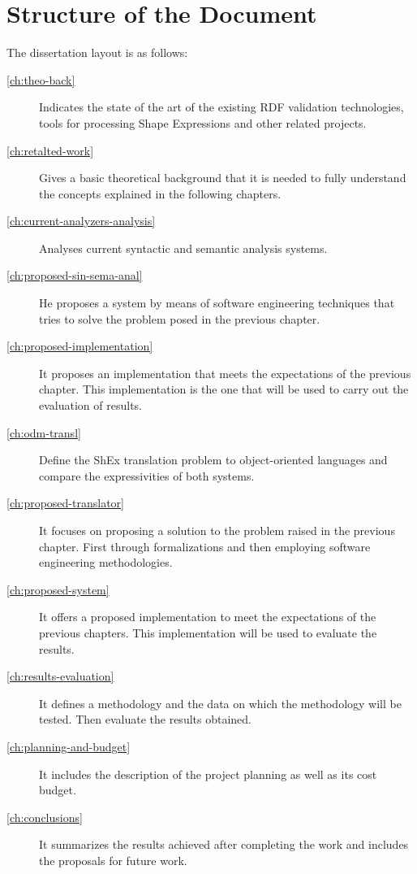 
\section{Structure of the Document}
\label{sec:intro-structure}
The dissertation layout is as follows:
\bigskip

\begin{description}
  \item[\cref{ch:theo-back}] Indicates the state of the art of the existing RDF validation technologies, tools for processing Shape
  Expressions and other related projects.
	\item[\cref{ch:retalted-work}] Gives a basic theoretical background that it is needed to fully understand the concepts explained in the
  following chapters.
  \item[\cref{ch:current-analyzers-analysis}] Analyses current syntactic and semantic analysis systems.
  \item[\cref{ch:proposed-sin-sema-anal}] He proposes a system by means of software engineering techniques
  that tries to solve the problem posed in the previous chapter.
  \item[\cref{ch:proposed-implementation}] It proposes an implementation that meets the expectations of the previous chapter.
  This implementation is the one that will be used to carry out the evaluation of results.
  \item[\cref{ch:odm-transl}] Define the ShEx translation problem to object-oriented languages and compare the
  expressivities of both systems.
  \item[\cref{ch:proposed-translator}] It focuses on proposing a solution to the problem raised in the previous chapter.
  First through formalizations and then employing software engineering methodologies.
  \item[\cref{ch:proposed-system}] It offers a proposed implementation to meet the expectations of the previous chapters.
  This implementation will be used to evaluate the results.
  \item[\cref{ch:results-evaluation}] It defines a methodology and the data on which the methodology will be tested. Then evaluate the results obtained.
  \item[\cref{ch:planning-and-budget}] It includes the description of the project planning as well as its cost budget.
  \item[\cref{ch:conclusions}] It summarizes the results achieved after completing the work and includes the proposals for future work.
\end{description}